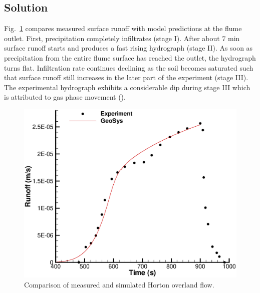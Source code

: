 \subsection{Solution}
%
Fig.~\ref{SFC:resultsWool} compares measured surface runoff with model predictions at the flume outlet.
First, precipitation completely infiltrates (stage I).
After about $7$ min surface runoff starts and produces a fast rising hydrograph (stage II).
As soon as precipitation from the entire flume surface has reached the outlet, the hydrograph turns flat.  
Infiltration rate continues declining as the soil becomes saturated such that surface runoff still increases in the later part of the experiment (stage III).
The experimental hydrograph exhibits a considerable dip during stage III which is attributed to gas phase movement (\cite{Smith:71}). 
%
\begin{figure} [htb!]
 \centering
 \includegraphics[width=0.75\columnwidth] {PART_II/H_SFC/Wool.eps}
 \caption{Comparison of measured and simulated Horton overland flow.}
 \label{SFC:resultsWool}
\end{figure}
%


